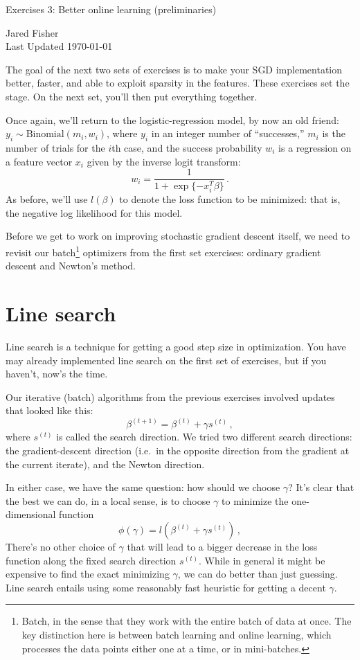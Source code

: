 \documentclass{article}
\begin{document}
\large 
\begin{center}
Exercises 3: Better online learning (preliminaries)

\vspace{10pt}
Jared Fisher\\
Last Updated \today
\end{center}
\normalsize



The goal of the next two sets of exercises is to make your SGD implementation better, faster, and able to exploit sparsity in the features.  These exercises set the stage.  On the next set, you'll then put everything together.

Once again, we'll return to the logistic-regression model, by now an old friend: $y_i \sim \mbox{Binomial}(m_i, w_i)$, where $y_i$ in an integer number of ``successes,'' $m_i$ is the number of trials for the $i$th case, and the success probability $w_i$ is a regression on a feature vector $x_i$ given by the inverse logit transform:
$$
w_i = \frac{1}{1 + \exp\{-x_i^T \beta\}} \, .
$$
As before, we'll use $l(\beta)$ to denote the loss function to be minimized: that is, the negative log likelihood for this model.

Before we get to work on improving stochastic gradient descent itself, we need to revisit our batch\footnote{Batch, in the sense that they work with the entire batch of data at once.  The key distinction here is between batch learning and online learning, which processes the data points either one at a time, or in mini-batches.} optimizers from the first set exercises: ordinary gradient descent and Newton's method.

\section{Line search}

Line search is a technique for getting a good step size in optimization.  You have may already implemented line search on the first set of exercises, but if you haven't, now's the time.

Our iterative (batch) algorithms from the previous exercises involved updates that looked like this:
$$
\beta^{(t+1)} = \beta^{(t)} + \gamma s^{(t)} \, ,
$$
where $s^{(t)}$ is called the search direction.  We tried two different search directions: the gradient-descent direction (i.e.~in the opposite direction from the gradient at the current iterate), and the Newton direction. 

In either case, we have the same question: how should we choose $\gamma$?  It's clear that the best we can do, in a local sense, is to choose $\gamma$ to minimize the one-dimensional function
$$
\phi(\gamma) = l(\beta^{(t)} + \gamma s^{(t)}) \, ,
$$
There's no other choice of $\gamma$ that will lead to a bigger decrease in the loss function along the fixed search direction $s^{(t)}$.  While in general it might be expensive to find the exact minimizing $\gamma$, we can do better than just guessing.  Line search entails using some reasonably fast heuristic for getting a decent $\gamma$.
\end{document}
